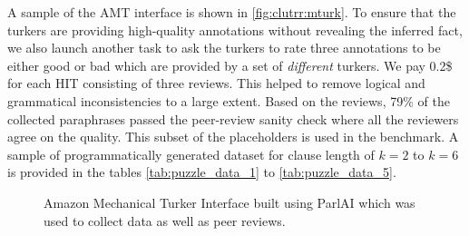 \documentclass[letterpaper, 12pt]{report}
\begin{document}
A sample of the AMT interface is shown in \autoref{fig:clutrr:mturk}.
To ensure that the turkers are providing high-quality annotations without revealing the inferred fact, we also launch another task to ask the turkers to rate three annotations to be either good or bad which are provided by a set of \textit{different} turkers. We pay 0.2\$ for each HIT consisting of three reviews. This helped to remove logical and grammatical inconsistencies to a large extent. Based on the reviews, 79\% of the collected paraphrases passed the peer-review sanity check where all the reviewers agree on the quality. This subset of the placeholders is used in the benchmark. A sample of programmatically generated dataset for clause length of $k=2$ to $k=6$ is provided in the tables \ref{tab:puzzle_data_1} to \ref{tab:puzzle_data_5}.

\begin{figure}[h]
  \centering
    \caption{Amazon Mechanical Turker Interface built using ParlAI which was used to collect data as well as peer reviews.}%
    \label{fig:clutrr:mturk}
\end{figure}
\end{document}
